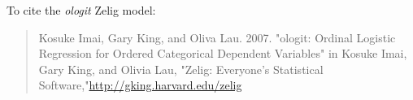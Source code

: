 To cite the \emph{ ologit } Zelig model:
 \begin{verse}
 Kosuke Imai, Gary King, and Oliva Lau. 2007. "ologit: Ordinal Logistic Regression for Ordered Categorical Dependent Variables" in Kosuke Imai, Gary King, and Olivia Lau, "Zelig: Everyone's Statistical Software,"\url{http://gking.harvard.edu/zelig} 
\end{verse}